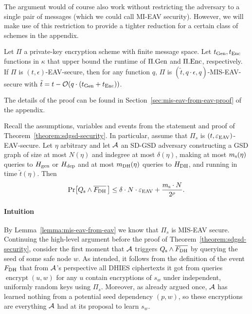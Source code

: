 The argument would of course also work without restricting the adversary to a single pair of messages (which we could call MI-EAV security). However, we will make use of this restriction to provide a tighter reduction for a certain class of schemes in the appendix.

\begin{lemma} \label{lemma:mis-eav-from-eav}
	Let $\Pi$ a private-key encryption scheme with finite message space. Let $t_{\mathrm{Gen}}, t_{\mathrm{Enc}}$ functions in $\kappa$ that upper bound the runtime of $\Pi.\mathrm{Gen}$ and $\Pi.\mathrm{Enc}$, respectively. If $\Pi$ is $(t, \epsilon)$-EAV-secure, then for any function $q$, $\Pi$ is $(\tilde{t}, q \cdot \epsilon, q)$-MIS-EAV-secure with $\tilde{t} = t - \mathcal{O}(q \cdot (t_{\mathrm{Gen}} + t_{\mathrm{Enc}}))$.
\end{lemma}

The details of the proof can be found in Section~\ref{sec:mis-eav-from-eav-proof} of the appendix.

\begin{lemma} \label{lemma:eav-reduction}
	Recall the assumptions, variables and events from the statement and proof of Theorem~\ref{theorem:sdgsd-security}. In particular, assume that $\Pi_s$ is $(t, \varepsilon_\mathrm{EAV})$-EAV-secure. Let $\eta$ arbitrary and let $\mathcal{A}$ an SD-GSD adversary constructing a GSD graph of size at most $N(\eta)$ and indegree at most $\delta(\eta)$, making at most $m_\mathrm{s}(\eta)$ queries to $H_\mathrm{gen}$ or $H_\mathrm{dep}$ and at most $m_\mathrm{DH}(\eta)$ queries to $H_\mathrm{DH}$, and running in time $\tilde{t}(\eta)$. Then
	\[
		\pr{\qs \land \overline{\fdh}\,} \le \delta \cdot N \cdot \eeav + \frac{\ms \cdot N}{2^\rho}.
	\]
\end{lemma}

\paragraph{Intuition} By Lemma~\vref{lemma:mis-eav-from-eav} we know that $\Pi_s$ is MIS-EAV secure. Continuing the high-level argument before the proof of Theorem~\ref{theorem:sdgsd-security}, consider the first moment that $\mathcal{A}$ triggers $Q_\mathrm{s} \land \overline{F_\mathrm{DH}}$ by querying the seed of some safe node $w$.  As intended, it follows from the definition of the event $F_\mathrm{DH}$ that from $\mathcal{A}$'s perspective all DHIES ciphertexts it got from queries $\operatorname{encrypt}(u, w)$ for any $u$ contain encryptions of $s_w$ under independent, uniformly random keys using $\Pi_s$. Moreover, as already argued once, $\mathcal{A}$ has learned nothing from a potential seed dependency $(p, w)$, so these encryptions are everything $\mathcal{A}$ had at its proposal to learn $s_w$.

